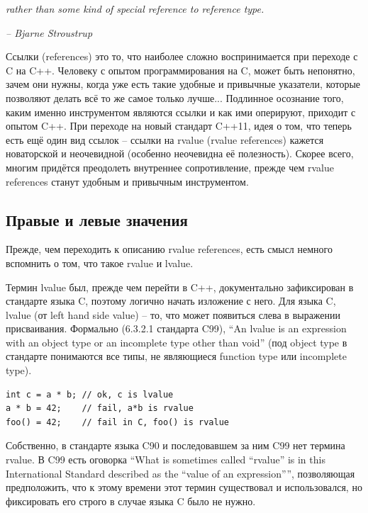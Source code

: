 \documentclass[a4paper,12pt,oneside]{book}
\begin{document}
\hfill\textit{rather than some kind of special reference to reference type.} {\vspace{0.5em}}

\hfill\textit{-- Bjarne Stroustrup}

Ссылки (references) это то, что наиболее сложно воспринимается при переходе с C на C++. Человеку с опытом программирования на C, может быть непонятно, зачем они нужны, когда уже есть такие удобные и привычные указатели, которые позволяют делать всё то же самое только лучше... Подлинное осознание того, каким именно инструментом являются ссылки и как ими оперируют, приходит с опытом C++. При переходе на новый стандарт C++11, идея о том, что теперь есть ещё один вид ссылок -- ссылки на rvalue (rvalue references) кажется новаторской и неочевидной (особенно неочевидна её полезность). Скорее всего, многим придётся преодолеть внутреннее сопротивление, прежде чем rvalue references станут удобным и привычным инструментом. 

\subsection{Правые и левые значения}\label{LRvaluesAgain}

Прежде, чем переходить к описанию rvalue references, есть смысл немного вспомнить о том, что такое rvalue и lvalue.

Термин lvalue был, прежде чем перейти в C++, документально зафиксирован в стандарте языка C, поэтому логично начать изложение с него. Для языка C, lvalue (от left hand side value) -- то, что может появиться слева в выражении присваивания. Формально (6.3.2.1 стандарта C99), ``An lvalue is an expression with an object type or an incomplete type other than void'' (под object type в стандарте понимаются все типы, не являющиеся function type или incomplete type).

\begin{lstlisting}
int c = a * b; // ok, c is lvalue
a * b = 42;    // fail, a*b is rvalue
foo() = 42;    // fail in C, foo() is rvalue
\end{lstlisting}

Собственно, в стандарте языка C90 и последовавшем за ним C99 нет термина rvalue. В C99 есть оговорка ``What is sometimes called ``rvalue'' is in this International Standard described as the ``value of an expression'''', позволяющая предположить, что к этому времени этот термин существовал и использовался, но фиксировать его строго в случае языка C было не нужно.
\end{document}
